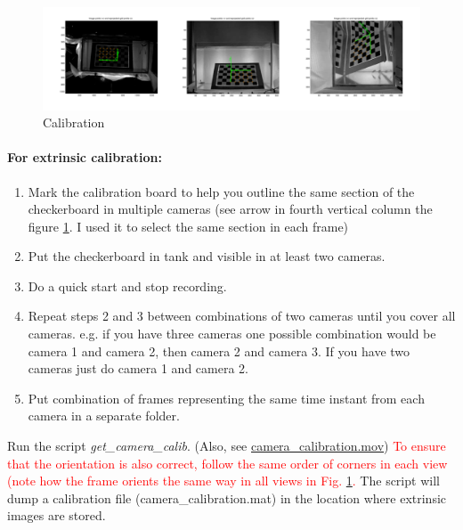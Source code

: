 \documentclass[11pt]{article}
\begin{document}
\begin{figure}[ht]
\centering
\includegraphics[width=.995\linewidth]{calib2}
\caption{Calibration}
\label{fig:calib}
\end{figure}
\paragraph{For extrinsic calibration:}
\begin{enumerate}
\item Mark the calibration board to help you outline the same section of the checkerboard in multiple cameras (see arrow in fourth vertical column the figure \ref{fig:calib}. I used it to select the same section in each frame)
\item Put the checkerboard in tank and visible in at least two cameras. 
\item Do a quick start and stop recording.
\item Repeat steps 2 and 3 between combinations of two cameras until you cover all cameras. e.g. if you have three cameras one possible combination would be camera 1 and camera 2, then camera  2 and camera 3. If you have two cameras just do camera 1 and camera 2.
\item Put combination of frames representing the same time instant from each camera in a separate folder.
\end{enumerate}

Run the script \emph{get\_camera\_calib}. (Also, see  \href{run:camera\_calibration.mov}{camera\_calibration.mov}) \textcolor{red}{To ensure that the orientation is also correct, follow the same order of corners in each view (note how the frame orients the same way in all views in Fig. \ref{fig:calib}.} The script will dump a calibration file (camera\_calibration.mat) in the location where extrinsic images are stored. 
\end{document}
